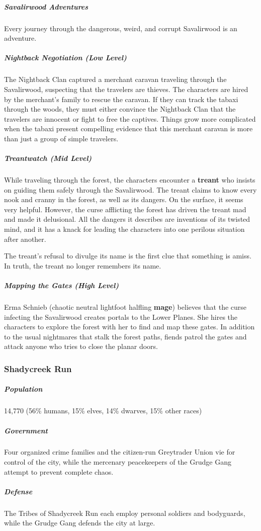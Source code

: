 \documentclass[10pt,a4paper,twoside,bg=print,twocolumn,openany,nodeprecatedcode]{dndbook}
\begin{document}
\subparagraph{Savalirwood Adventures}
Every journey through the dangerous, weird, and corrupt Savalirwood is an adventure.

\subparagraph{Nightback Negotiation (Low Level)}
The Nightback Clan captured a merchant caravan traveling through the Savalirwood, suspecting that the travelers are thieves. The characters are hired by the merchant's family to rescue the caravan. If they can track the tabaxi through the woods, they must either convince the Nightback Clan that the travelers are innocent or fight to free the captives. Things grow more complicated when the tabaxi present compelling evidence that this merchant caravan is more than just a group of simple travelers.

\subparagraph{Treantwatch (Mid Level)}
While traveling through the forest, the characters encounter a \textbf{treant} who insists on guiding them safely through the Savalirwood. The treant claims to know every nook and cranny in the forest, as well as its dangers. On the surface, it seems very helpful. However, the curse afflicting the forest has driven the treant mad and made it delusional. All the dangers it describes are inventions of its twisted mind, and it has a knack for leading the characters into one perilous situation after another.

The treant's refusal to divulge its name is the first clue that something is amiss. In truth, the treant no longer remembers its name.

\subparagraph{Mapping the Gates (High Level)}
Erma Schnieb (chaotic neutral lightfoot halfling \textbf{mage}) believes that the curse infecting the Savalirwood creates portals to the Lower Planes. She hires the characters to explore the forest with her to find and map these gates. In addition to the usual nightmares that stalk the forest paths, fiends patrol the gates and attack anyone who tries to close the planar doors.

\subsubsection{Shadycreek Run}
\subparagraph{Population}
14,770 (56\% humans, 15\% elves, 14\% dwarves, 15\% other races)

\subparagraph{Government}
Four organized crime families and the citizen-run Greytrader Union vie for control of the city, while the mercenary peacekeepers of the Grudge Gang attempt to prevent complete chaos.

\subparagraph{Defense}
The Tribes of Shadycreek Run each employ personal soldiers and bodyguards, while the Grudge Gang defends the city at large.
\end{document}
